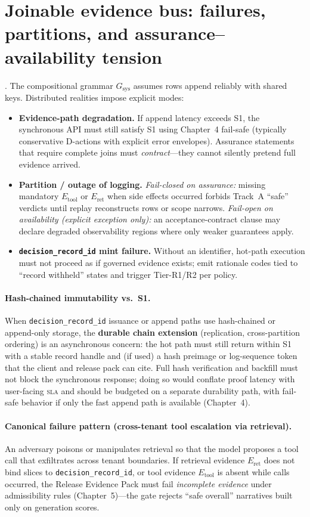\documentclass[11pt,a4paper]{report}
\begin{document}
\section{Joinable evidence bus: failures, partitions, and assurance--availability tension}
\ControlPlane{}. The compositional grammar $G_{\mathrm{sys}}$ assumes rows append reliably with shared keys. Distributed realities impose explicit modes:
\begin{itemize}
  \item \textbf{Evidence-path degradation.} If append latency exceeds S1, the synchronous API must still satisfy S1 using Chapter~4 fail-safe (typically conservative D-actions with explicit error envelopes). Assurance statements that require complete joins must \emph{contract}---they cannot silently pretend full evidence arrived.
  \item \textbf{Partition / outage of logging.} \emph{Fail-closed on assurance:} missing mandatory $E_{\mathrm{tool}}$ or $E_{\mathrm{ret}}$ when side effects occurred forbids Track~A ``safe'' verdicts until replay reconstructs rows or scope narrows. \emph{Fail-open on availability (explicit exception only):} an acceptance-contract clause may declare degraded observability regions where only weaker guarantees apply.
  \item \textbf{\texttt{decision\_record\_id} mint failure.} Without an identifier, hot-path execution must not proceed as if governed evidence exists; emit rationale codes tied to ``record withheld'' states and trigger Tier-R1/R2 per policy.
\end{itemize}

\paragraph{Hash-chained immutability vs.\ S1.} When \texttt{decision\_record\_id} issuance or append paths use hash-chained or append-only storage, the \textbf{durable chain extension} (replication, cross-partition ordering) is an asynchronous concern: the hot path must still return within S1 with a stable record handle and (if used) a hash preimage or log-sequence token that the client and release pack can cite. Full hash verification and backfill must not block the synchronous response; doing so would conflate proof latency with user-facing \textsc{sla} and should be budgeted on a separate durability path, with fail-safe behavior if only the fast append path is available (Chapter~4).

\paragraph{Canonical failure pattern (cross-tenant tool escalation via retrieval).} An adversary poisons or manipulates retrieval so that the model proposes a tool call that exfiltrates across tenant boundaries. If retrieval evidence $E_{\mathrm{ret}}$ does not bind slices to \texttt{decision\_record\_id}, or tool evidence $E_{\mathrm{tool}}$ is absent while calls occurred, the Release Evidence Pack must fail \emph{incomplete evidence} under admissibility rules (Chapter~5)---the gate rejects ``safe overall'' narratives built only on generation scores.
\end{document}
